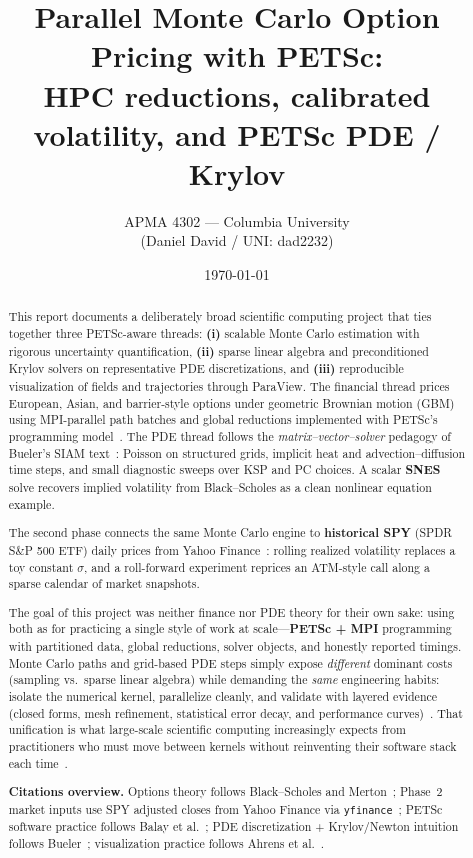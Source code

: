 \documentclass[11pt]{article}
\title{\textbf{Parallel Monte Carlo Option Pricing with PETSc:}\\
HPC reductions, calibrated volatility, and PETSc PDE / Krylov}
\author{APMA 4302 --- Columbia University\\
\small (Daniel David / UNI: dad2232)}
\date{\today}
\begin{document}
\maketitle

\begin{abstract}
This report documents a deliberately broad scientific computing project that
ties together three PETSc-aware threads: \textbf{(i)} scalable Monte Carlo estimation with
rigorous uncertainty quantification, \textbf{(ii)} sparse linear algebra and
preconditioned Krylov solvers on representative PDE discretizations, and
\textbf{(iii)} reproducible visualization of fields and trajectories through
ParaView. The financial thread prices European, Asian, and barrier-style options
under geometric Brownian motion (GBM) using MPI-parallel path batches and global
reductions implemented with PETSc's programming model~\cite{petsc-user-ref,petsc-efficient}.
The PDE thread follows the \emph{matrix--vector--solver} pedagogy of Bueler's SIAM
text~\cite{bueler2020petsc}: Poisson on structured grids, implicit heat and
advection--diffusion time steps, and small diagnostic sweeps over \textsf{KSP} and
\textsf{PC} choices. A scalar \textbf{SNES} solve recovers implied volatility from
Black--Scholes as a clean nonlinear equation example. 
\medskip

The second phase connects the same Monte Carlo engine to \textbf{historical SPY}
(SPDR S\&P 500 ETF) daily prices from Yahoo Finance~\cite{yahoofinance,yfinance,spy-etf}:
rolling realized volatility replaces a toy constant $\sigma$, and a roll-forward
experiment reprices an ATM-style call along a sparse calendar of market snapshots.

\medskip
The goal of this project was neither finance nor PDE theory for their own
sake: using both as for practicing a single style of work at
scale---\textbf{PETSc + MPI} programming with partitioned data, global reductions,
solver objects, and honestly reported timings. Monte Carlo paths and grid-based PDE
steps simply expose \emph{different} dominant costs (sampling vs.\ sparse linear
algebra) while demanding the \emph{same} engineering habits: isolate the numerical
kernel, parallelize cleanly, and validate with layered evidence (closed forms, mesh
refinement, statistical error decay, and performance curves)~\cite{bueler2020petsc,petsc-user-ref}.
That unification is what large-scale scientific computing increasingly expects from
practitioners who must move between kernels without reinventing their software stack
each time~\cite{petsc-efficient}.


\medskip
\noindent\textbf{Citations overview.}
Options theory follows Black--Scholes and Merton~\cite{blackscholes,merton1973};
Phase~2 market inputs use SPY adjusted closes from Yahoo Finance via
\texttt{yfinance}~\cite{yahoofinance,yfinance,spy-etf};
PETSc software practice follows Balay et al.~\cite{petsc-user-ref,petsc-efficient};
PDE discretization + Krylov/Newton intuition follows Bueler~\cite{bueler2020petsc};
visualization practice follows Ahrens et al.~\cite{paraview-guide}.
\end{abstract}
\end{document}
